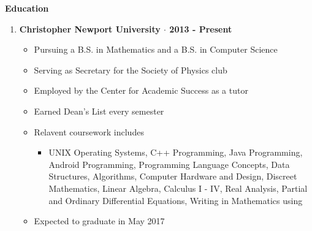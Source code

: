 \noindent\textbf{\large Education}
\begin{enumerate}[label={\Roman*}.]
\item \textbf{Christopher Newport University $\cdot$ 2013 - Present}
\begin{itemize}
\item Pursuing a B.S. in Mathematics and a B.S. in Computer Science
\item Serving as Secretary for the Society of Physics club
\item Employed by the Center for Academic Success as a tutor
\item Earned Dean's List every semester
\item Relavent coursework includes
\begin{itemize}
\item UNIX Operating Systems, C++ Programming, Java Programming, Android Programming, Programming Language
Concepts, Data Structures, Algorithms, Computer Hardware and Design, Discreet Mathematics, Linear Algebra,
Calculus I - IV, Real Analysis, Partial and Ordinary Differential Equations, Writing in Mathematics using
\end{itemize}
\item Expected to graduate in May 2017
\end{itemize}
\end{enumerate}
